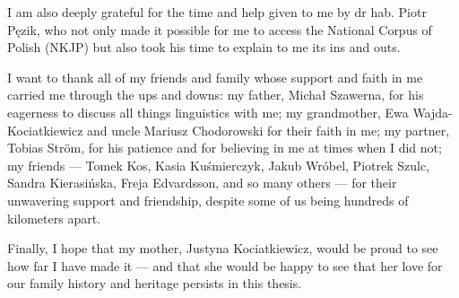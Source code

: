 \documentclass[12pt, a4paper]{article}  %
\begin{document}
I am also deeply grateful for the time and help given to me by dr hab. Piotr Pęzik, who not only made it possible for me to access the National Corpus of Polish (NKJP) but also took his time to explain to me its ins and outs.

I want to thank all of my friends and family whose support and faith in me carried me through the ups and downs: my father, Michał Szawerna, for his eagerness to discuss all things linguistics with me; my grandmother, Ewa Wajda-Kociatkiewicz and uncle Mariusz Chodorowski for their faith in me; my partner, Tobias Ström, for his patience and for believing in me at times when I did not; my friends --- Tomek Kos, Kasia Kuśmierczyk, Jakub Wróbel, Piotrek Szulc, Sandra Kierasińska, Freja Edvardsson, and so many others --- for their unwavering support and friendship, despite some of us being hundreds of kilometers apart.

Finally, I hope that my mother, Justyna Kociatkiewicz, would be proud to see how far I have made it --- and that she would be happy to see that her love for our family history and heritage persists in this thesis.

\thispagestyle{empty}

\newpage
\thispagestyle{empty}
\begingroup
\hypersetup{linkcolor=black} %
\begin{spacing}{0.0}
\tableofcontents
\thispagestyle{empty}
\end{spacing}
\newpage
\thispagestyle{empty}
\listoffigures
\newpage
\thispagestyle{empty}
\listoftables
\endgroup
\thispagestyle{empty}

\newpage
\setcounter{page}{1}






\newpage


\end{document}
